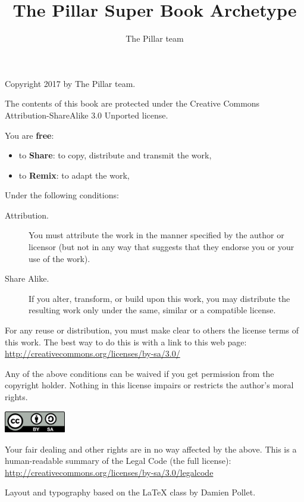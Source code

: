 \documentclass[10pt,twoside,english]{_support/latex/sbabook/sbabook}
\title{The Pillar Super Book Archetype}
\author{The Pillar team}
\begin{document}
\maketitle
\pagestyle{titlingpage}
\thispagestyle{titlingpage} %

\cleartoverso
{\small

  Copyright 2017 by The Pillar team.

  The contents of this book are protected under the Creative Commons
  Attribution-ShareAlike 3.0 Unported license.

  You are \textbf{free}:
  \begin{itemize}
  \item to \textbf{Share}: to copy, distribute and transmit the work,
  \item to \textbf{Remix}: to adapt the work,
  \end{itemize}

  Under the following conditions:
  \begin{description}
  \item[Attribution.] You must attribute the work in the manner specified by the
    author or licensor (but not in any way that suggests that they endorse you
    or your use of the work).
  \item[Share Alike.] If you alter, transform, or build upon this work, you may
    distribute the resulting work only under the same, similar or a compatible
    license.
  \end{description}

  For any reuse or distribution, you must make clear to others the
  license terms of this work. The best way to do this is with a link to
  this web page: \\
  \url{http://creativecommons.org/licenses/by-sa/3.0/}

  Any of the above conditions can be waived if you get permission from
  the copyright holder. Nothing in this license impairs or restricts the
  author's moral rights.

  \begin{center}
    \includegraphics[width=0.2\textwidth]{_support/latex/sbabook/CreativeCommons-BY-SA.pdf}
  \end{center}

  Your fair dealing and other rights are in no way affected by the
  above. This is a human-readable summary of the Legal Code (the full
  license): \\
  \url{http://creativecommons.org/licenses/by-sa/3.0/legalcode}

  \vfill

  Layout and typography based on the  \LaTeX{} class by Damien
  Pollet.
}
\end{document}
